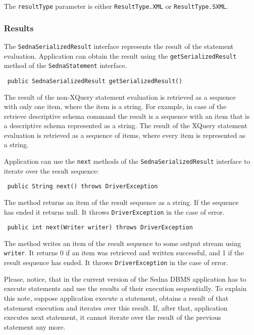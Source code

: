 \documentclass[a4paper,12pt]{article}
\begin{document}
The \verb!resultType! parameter is either \verb!ResultType.XML! or
\verb!ResultType.SXML!.


\subsubsection{Results}
\label{sec:results}

The \verb!SednaSerializedResult! interface represents the result of the
statement evaluation. Application can obtain the result using the
\verb!getSerializedResult! method of the \verb!SednaStatement! interface.

\begin{verbatim}
 public SednaSerializedResult getSerializedResult()
\end{verbatim}

The result of the non-XQuery statement evaluation is retrieved as a sequence
with only one item, where the item is a string. For example, in case of the
retrieve descriptive schema command the result is a sequence with an item that
is a descriptive schema represented as a string. The result of the XQuery
statement evaluation is retrieved as a sequence of items, where every item is
represented as a string.

Application can use the \verb!next! methods of the \verb!SednaSerializedResult!
interface to iterate over the result sequence:

\begin{verbatim}
 public String next() throws DriverException
\end{verbatim}

The method returns an item of the result sequence as a string. If the sequence
has ended it returns null. It throws \verb!DriverException! in the case of
error.

\begin{verbatim}
 public int next(Writer writer) throws DriverException
\end{verbatim}

The method writes an item of the result sequence to some output stream using
\verb!writer!. It returns 0 if an item was retrieved and written successful, and
1 if the result sequence has ended. It throws \verb!DriverException! in the case
of error.

Please, notice, that in the current version of the Sedna DBMS application has to
execute statements and use the results of their execution sequentially. To
explain this note, suppose application execute a statement, obtains a result of
that statement execution and iterates over this result. If, after that,
application executes next statement, it cannot iterate over the result of the
previous statement any more.
\end{document}
